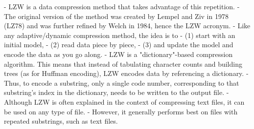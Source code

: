 - LZW is a data compression method that takes advantage of this repetition.
- The original version of the method was created by Lempel and Ziv in 1978 (LZ78) and was further refined by Welch in 1984, hence the LZW acronym. 
- Like any adaptive/dynamic compression method, the idea is to 
 - (1) start with an initial model, 
 - (2) read data piece by piece, 
 - (3) and update the model and encode the data as you go along.
- LZW is a "dictionary"-based compression algorithm. This means that instead of tabulating character counts and building trees (as for Huffman encoding), LZW encodes data by referencing a dictionary. 
- Thus, to encode a substring, only a single code number, corresponding to that substring's index in the dictionary, needs to be written to the output file. 
- Although LZW is often explained in the context of compressing text files, it can be used on any type of file. 
- However, it generally performs best on files with repeated substrings, such as text files.

